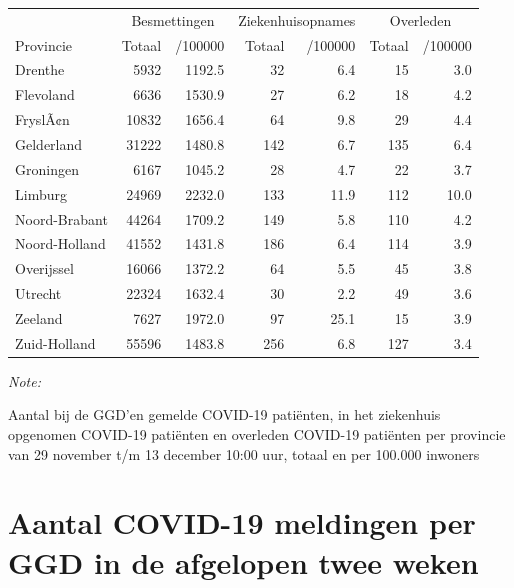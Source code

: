 \documentclass[
  english,
  man,floatsintext]{apa6}
\begin{document}
\begin{table}
\centering
\begin{threeparttable}
\begin{tabular}{lrrrrrr}
\toprule
\multicolumn{1}{c}{ } & \multicolumn{2}{c}{Besmettingen} & \multicolumn{2}{c}{Ziekenhuisopnames} & \multicolumn{2}{c}{Overleden} \\
\cmidrule(l{3pt}r{3pt}){2-3} \cmidrule(l{3pt}r{3pt}){4-5} \cmidrule(l{3pt}r{3pt}){6-7}
Provincie & Totaal & /100000 & Totaal & /100000 & Totaal & /100000\\
\midrule
Drenthe & 5932 & 1192.5 & 32 & 6.4 & 15 & 3.0\\
Flevoland & 6636 & 1530.9 & 27 & 6.2 & 18 & 4.2\\
FryslÃ¢n & 10832 & 1656.4 & 64 & 9.8 & 29 & 4.4\\
Gelderland & 31222 & 1480.8 & 142 & 6.7 & 135 & 6.4\\
Groningen & 6167 & 1045.2 & 28 & 4.7 & 22 & 3.7\\
Limburg & 24969 & 2232.0 & 133 & 11.9 & 112 & 10.0\\
Noord-Brabant & 44264 & 1709.2 & 149 & 5.8 & 110 & 4.2\\
Noord-Holland & 41552 & 1431.8 & 186 & 6.4 & 114 & 3.9\\
Overijssel & 16066 & 1372.2 & 64 & 5.5 & 45 & 3.8\\
Utrecht & 22324 & 1632.4 & 30 & 2.2 & 49 & 3.6\\
Zeeland & 7627 & 1972.0 & 97 & 25.1 & 15 & 3.9\\
Zuid-Holland & 55596 & 1483.8 & 256 & 6.8 & 127 & 3.4\\
\bottomrule
\end{tabular}
\begin{tablenotes}
\item \textit{Note: } 
\item Aantal bij de GGD’en gemelde COVID-19 patiënten, in het ziekenhuis opgenomen COVID-19 patiënten en overleden COVID-19 patiënten per provincie van 29 november t/m 13 december 10:00 uur, totaal en per 100.000 inwoners
\end{tablenotes}
\end{threeparttable}
\end{table}

\newpage

\hypertarget{aantal-covid-19-meldingen-per-ggd-in-de-afgelopen-twee-weken}{%
\section{Aantal COVID-19 meldingen per GGD in de afgelopen twee weken}\label{aantal-covid-19-meldingen-per-ggd-in-de-afgelopen-twee-weken}}
\end{document}
